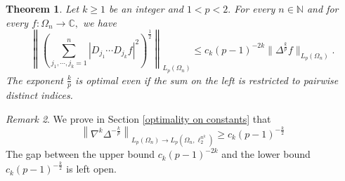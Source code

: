 \documentclass{amsart}
\numberwithin{equation}{section}
\newtheorem{thm}{Theorem}[section]
\theoremstyle{definition}
\theoremstyle{remark}
\newtheorem{rem}[thm]{Remark}
\newcommand{\1}{\mathbf 1}
\begin{document}
%


\begin{thm}\label{thm:higher-main}
Let $k\geq1$ be an integer and $1<p<2.$ For every $n\in\mathbb{N}$ and for every $f:\Omega_n\to\mathbb{C},$ we have
\[
 \left\|\left(\sum_{j_1,\cdots,j_k=1}^n
 |D_{j_{1}}\cdots D_{j_{k}}f|^{2}\right)^{\frac12}\right\|_{L_p(\Omega_n)}\leq c_k(p-1)^{-2k}\|\Delta^{\frac{k}{p}}f\|_{L_p(\Omega_n)}.
\]
The exponent $\frac{k}{p}$ is optimal even if the sum on the left is restricted to pairwise distinct indices.
\end{thm}

\begin{rem}
We prove in Section \ref{optimality on constants} that 
\[
\left\|\nabla^k\Delta^{-\frac{k}{p}}\right\|_{L_p(\Omega_n)\to L_p(\Omega_n,\ell_2^{n^{k}})}\geq c_k(p-1)^{-\frac{k}{2}}
\]
The gap between the upper bound $c_k(p-1)^{-2k}$ and the lower bound $c_k(p-1)^{-\frac{k}{2}}$ is left open.
\end{rem}
\end{document}
